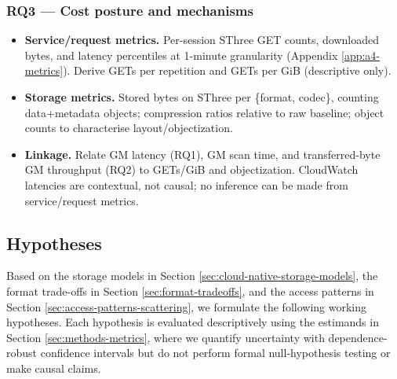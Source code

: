 \documentclass[nomenclature, english, bibtex]{kththesis}
\numberwithin{listing}{chapter}
\begin{document}
\subsubsection{RQ3 — Cost posture and mechanisms}
\label{sec:methods-rq3}
\begin{itemize}
  \item \textbf{Service/request metrics.} Per-session \gls{SThree} GET counts, downloaded bytes, and latency percentiles at 1-minute granularity (Appendix \ref{app:a4-metrics}). Derive GETs per repetition and GETs per GiB (descriptive only).
  \item \textbf{Storage metrics.} Stored bytes on \gls{SThree} per \{format, codec\}, counting data+metadata objects; compression ratios relative to raw baseline; object counts to characterise layout/objectization.
  \item \textbf{Linkage.} Relate \gls{GM} latency (RQ1), \gls{GM} scan time, and transferred-byte \gls{GM} throughput (RQ2) to GETs/GiB and objectization. CloudWatch latencies are contextual, not causal; no inference can be made from service/request metrics.
\end{itemize}

\subsection{Hypotheses}
\label{sec:methods-hypotheses}
Based on the storage models in Section \ref{sec:cloud-native-storage-models}, the format trade-offs in Section \ref{sec:format-tradeoffs}, and the access patterns in Section \ref{sec:access-patterns-scattering}, we formulate the following working hypotheses. Each hypothesis is evaluated descriptively using the estimands in Section \ref{sec:methods-metrics}, where we quantify uncertainty with dependence-robust confidence intervals but do not perform formal null-hypothesis testing or make causal claims.
\end{document}
